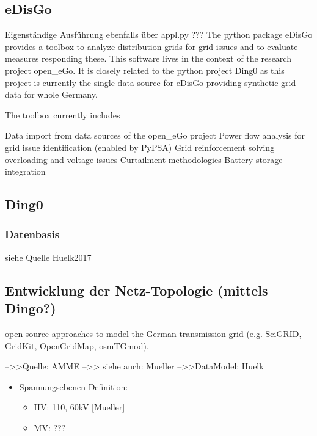 \documentclass[
a4paper,     %
12pt         %
]{scrartcl}  %
\begin{document}
\subsection{eDisGo}
Eigenständige Ausführung ebenfalls über appl.py ???
The python package eDisGo provides a toolbox to analyze distribution grids for grid issues and to evaluate measures responding these. This software lives in the context of the research project open\_eGo. It is closely related to the python project Ding0 as this project is currently the single data source for eDisGo providing synthetic grid data for whole Germany.

The toolbox currently includes

Data import from data sources of the open\_eGo project
Power flow analysis for grid issue identification (enabled by PyPSA)
Grid reinforcement solving overloading and voltage issues
Curtailment methodologies
Battery storage integration


\subsection{Ding0}
\subsubsection{Datenbasis}
siehe Quelle Huelk2017
\subsection{Entwicklung der Netz-Topologie (mittels Dingo?)}
\label{netz-topo_dingo}
open source approaches to model
the German transmission grid (e.g. SciGRID, GridKit, OpenGridMap, osmTGmod).

-->>Quelle: AMME
-->> siehe auch: Mueller
-->>DataModel: Huelk
\begin{itemize}
	\item[] Spannungsebenen-Definition:
	\begin{itemize}
		\item HV: 110, 60kV [Mueller]
		\item MV: ???
	\end{itemize}

\end{itemize}
\end{document}
